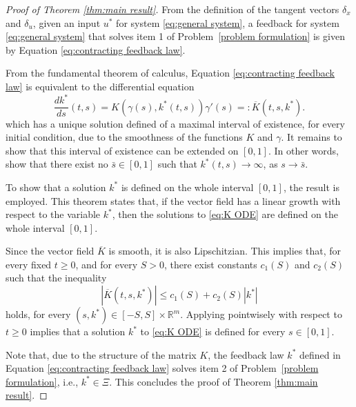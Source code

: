 \documentclass[10pt,twocolumn,twoside]{IEEEtran}
\theoremstyle{plain}
\theoremstyle{definition}
\theoremstyle{remark}
\begin{document}
\begin{proof}[Proof of Theorem \ref{thm:main result}]
	From the definition of the tangent vectors $\delta_x$ and $\delta_u$, given an input $u^\ast$ for system \eqref{eq:general system}, a feedback for system \eqref{eq:general system} that solves item 1 of Problem~\ref{problem formulation} is given by Equation \eqref{eq:contracting feedback law}. 
	
	From the fundamental theorem of calculus, Equation \eqref{eq:contracting feedback law} is equivalent to the differential equation
	\begin{equation}\label{eq:K ODE}
		\frac{dk^\ast}{ds}(t,s)=K(\gamma(s),k^\ast(t,s))\gamma'(s)=:\overline{K}(t,s,k^\ast).
	\end{equation}
	which has a unique solution defined of a maximal interval of existence, for every initial condition, due to the smoothness of the functions $K$ and $\gamma$. It remains to show that this interval of existence can be extended on $[0,1]$. In other words, show that there exist no $\bar{s}\in[0,1]$ such that $k^\ast(t,s)\to\infty$, as $s\to\bar{s}$.
	
	To show that a solution $k^\ast$ is defined on the whole interval $[0,1]$, the result  \cite[Theorem 2.12]{Teschl2012} is employed. This theorem states that, if the vector field has a linear growth with respect to the variable $k^\ast$, then the solutions to \eqref{eq:K ODE} are defined on the whole interval $[0,1]$.
		
	Since the vector field $\overline{K}$ is smooth, it is also Lipschitzian. This implies that, for every fixed $t\geq0$, and for every $S>0$, there exist constants $c_1(S)$ and $c_2(S)$ such that the inequality
	\begin{equation*}
		\left|\overline{K}(t,s,k^\ast)\right|\leq c_1(S)+c_2(S)|k^\ast|
	\end{equation*}
	holds, for every $(s,k^\ast)\in [-S,S]\times\mathbb{R}^m$. Applying \cite[Theorem 2.12]{Teschl2012} pointwisely with respect to $t\geq0$ implies that a solution $k^\ast$ to \eqref{eq:K ODE} is defined for every $s\in[0,1]$.
	
	Note that, due to the structure of the matrix $K$, the feedback law $k^\ast$ defined in Equation \eqref{eq:contracting feedback law} solves item 2 of Problem~\ref{problem formulation}, i.e., $k^\ast\in\Xi$. This concludes the proof of Theorem \ref{thm:main result}.
\end{proof}
\end{document}
